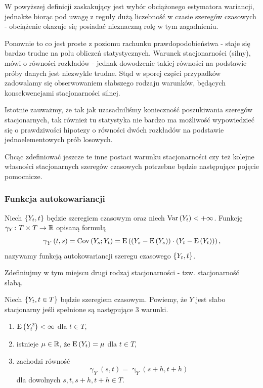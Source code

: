 \documentclass[10pt,a4paper]{book}
\newcommand{\tsAutoCovariance}[3][\gamma]{\operatorname{#1}_{#2} \left({#3}\right)}
\begin{document}
W powyższej definicji zaskakujący jest wybór obciążonego estymatora wariancji, jednakże biorąc pod uwagę z reguły dużą liczebność w czasie szeregów czasowych - obciążenie okazuje się posiadać nieznaczną rolę w tym zagadnieniu.

Ponownie to co jest proste z poziomu rachunku prawdopodobieństwa - staje się bardzo trudne na polu obliczeń statystycznych. Warunek stacjonarności (silny), mówi o równości rozkładów - jednak dowodzenie takiej równości na podstawie próby danych jest niezwykle trudne. Stąd w sporej części przypadków zadowalamy się obserwowaniem słabszego rodzaju warunków, będących konsekwencjami stacjonarności silnej.

\begin{remark*}
Istotnie zauważmy, że tak jak uzasadniliśmy konieczność poszukiwania szeregów stacjonarnych, tak również tu statystyka nie bardzo ma możliwość wypowiedzieć się o prawdziwości hipotezy o równości dwóch rozkładów na podstawie jednoelementowych prób losowych.
\end{remark*}

Chcąc zdefiniować jeszcze te inne postaci warunku stacjonarności czy też kolejne własności stacjonarnych szeregów czasowych potrzebne będzie następujące pojęcie pomocnicze.

\subsubsection{Funkcja autokowariancji}

\begin{definition}
Niech $\left\lbrace {{Y_t}, {t}} \right\rbrace$ będzie szeregiem czasowym oraz niech $ \operatorname{Var} \left( {Y_t} \right) < +\infty$. Funkcję $ \gamma_Y \colon T \times T \to \mathbb{R}$ opisaną formułą 
$$
\tsAutoCovariance{Y}{t,s}= \Covariance{Y_s}{Y_t} = \Ex{ \bracket{Y_s - \Ex{Y_s}} \cdot \bracket{Y_t - \Ex{Y_t}}  },
$$
nazywamy funkcją autokowariancji szeregu czasowego $\left\lbrace {{Y_t}, {t}} \right\rbrace$.
\end{definition}

Zdefiniujmy w tym miejscu drugi rodzaj stacjonarności - tzw. stacjonarność słabą.

\begin{definition}
Niech $\left\lbrace {{Y_t}, {t \in T}} \right\rbrace$ będzie szeregiem czasowym. Powiemy, że $Y$ jest słabo stacjonarny jeśli spełnione są następujące 3 warunki.
\begin{enumerate}
\item $ \operatorname{E} \left({Y_t^2} \right) < \infty$ dla $t \in T$,
\item istnieje $\mu \in \mathbb{R}$, że $ \operatorname{E} \left({Y_t} \right) = \mu $ dla $t \in T$,
\item zachodzi równość
$$
\tsAutoCovariance{Y}{s,t}= \tsAutoCovariance{Y}{s+h,t+h}
$$
dla dowolnych $s,t,s+h,t+h \in T$.
\end{enumerate}
\end{definition}
\end{document}
